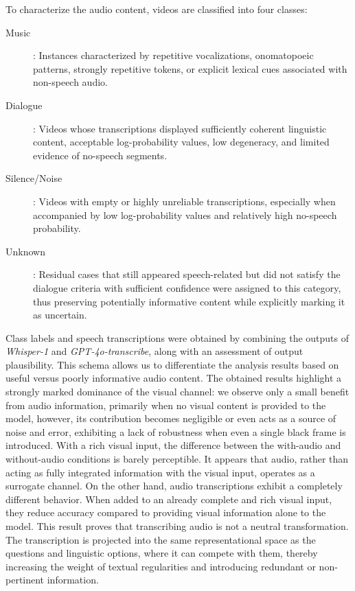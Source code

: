 To characterize the audio content, videos are classified into four classes:
\begin{description}
\item[Music]: Instances characterized by repetitive vocalizations, onomatopoeic patterns, strongly repetitive tokens, or explicit lexical cues associated with non-speech audio.
\item[Dialogue]: Videos whose transcriptions displayed sufficiently coherent linguistic content, acceptable log-probability values, low degeneracy, and limited evidence of no-speech segments.
\item[Silence/Noise]: Videos with empty or highly unreliable transcriptions, especially when accompanied by low log-probability values and relatively high no-speech probability.
\item[Unknown]: Residual cases that still appeared speech-related but did not satisfy the dialogue criteria with sufficient confidence were assigned to this category, thus preserving potentially informative content while explicitly marking it as uncertain.
\end{description}
Class labels and speech transcriptions were obtained by combining the outputs of \textit{Whisper-1} and \textit{GPT-4o-transcribe}, along with an assessment of output plausibility. This schema allows us to differentiate the analysis results based on useful versus poorly informative audio content.
The obtained results highlight a strongly marked dominance of the visual channel: we observe only a small benefit from audio information, primarily when no visual content is provided to the model, however, its contribution becomes negligible or even acts as a source of noise and error, exhibiting a lack of robustness when even a single black frame is introduced.
With a rich visual input, the difference between the with-audio and without-audio conditions is barely perceptible. It appears that audio, rather than acting as fully integrated information with the visual input, operates as a surrogate channel.
On the other hand, audio transcriptions exhibit a completely different behavior. When added to an already complete and rich visual input, they reduce accuracy compared to providing visual information alone to the model. This result proves that transcribing audio is not a neutral transformation. The transcription is projected into the same representational space as the questions and linguistic options, where it can compete with them, thereby increasing the weight of textual regularities and introducing redundant or non-pertinent information.
